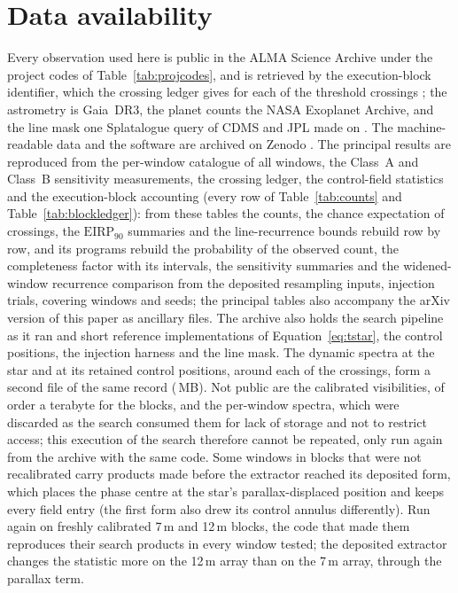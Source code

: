 \section*{Data availability}
\label{sec:data}
Every observation used here is public in the ALMA Science Archive under the
\NProjCodes{} project codes of Table~\ref{tab:projcodes}, and is retrieved by
the execution-block identifier, which the crossing ledger gives for each of the
\EvNCrossRaw{} threshold crossings \citep{Chen2022}; the astrometry is
Gaia~DR3, the planet counts the NASA Exoplanet Archive, and the line mask one
Splatalogue query of CDMS and JPL made on \McQueryDate. The machine-readable
data and the software are archived on Zenodo \citep{SIdeposit}. The principal
results are reproduced from the per-window catalogue of all \NWindows{}
windows, the Class~A and Class~B sensitivity measurements, the crossing
ledger, the control-field statistics and the execution-block accounting
(every row of Table~\ref{tab:counts} and Table~\ref{tab:blockledger}): from
these tables the counts, the chance expectation of \CeExp{} crossings, the
$\mathrm{EIRP}_{90}$ summaries and the line-recurrence bounds rebuild row by
row, and its programs rebuild the probability of the observed count, the
completeness factor with its intervals, the sensitivity summaries and the
widened-window recurrence comparison from the deposited resampling inputs,
injection trials, covering windows and seeds; the principal tables
also accompany the arXiv version of this paper as ancillary files. The archive
also holds the search pipeline as it ran and short reference implementations
of Equation~\ref{eq:tstar}, the control positions, the injection harness and
the line mask. The dynamic spectra at the star
and at its \RcNRetCtrl{} retained control positions, around each of the
\DaNSpecCross{} crossings, form a second file of the same record
(\DaSpecFileMB\,MB). Not
public are the calibrated visibilities, of order a terabyte for the \NEB{}
blocks, and the per-window spectra, which were discarded as the search
consumed them for lack of storage and not to restrict access; this execution
of the search therefore cannot be repeated, only run again from the archive
with the same code. Some windows in blocks that were not recalibrated carry products made
before the extractor reached its deposited form, which places the phase
centre at the star's parallax-displaced position and keeps every field
entry (the first form also drew its control annulus differently). Run
again on freshly calibrated 7\,m and 12\,m blocks, the code that made them
reproduces their search products in every window tested; the deposited
extractor changes the statistic more on the 12\,m array than on the 7\,m
array, through the parallax term.
